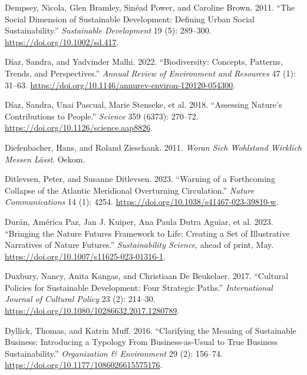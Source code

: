 \documentclass[
  a4paper,
  DIV=11,
  numbers=noendperiod,
  oneside,
  openany]{scrreprt}
\newlength{\cslhangindent}
\newenvironment{CSLReferences}[2] %
 {\begin{list}{}{%
  \setlength{\itemindent}{0pt}
  \setlength{\leftmargin}{0pt}
  \setlength{\parsep}{0pt}
  \ifodd #1
   \setlength{\leftmargin}{\cslhangindent}
   \setlength{\itemindent}{-1\cslhangindent}
  \fi
  \setlength{\itemsep}{#2\baselineskip}}}
 {\end{list}}
\begin{document}
\begin{CSLReferences}{1}{1}
Dempsey, Nicola, Glen Bramley, Sinéad Power, and Caroline Brown. 2011.
{``The Social Dimension of Sustainable Development: {Defining} Urban
Social Sustainability.''} \emph{Sustainable Development} 19 (5):
289--300. \url{https://doi.org/10.1002/sd.417}.

Díaz, Sandra, and Yadvinder Malhi. 2022. {``Biodiversity: {Concepts},
{Patterns}, {Trends}, and {Perspectives}.''} \emph{Annual Review of
Environment and Resources} 47 (1): 31--63.
\url{https://doi.org/10.1146/annurev-environ-120120-054300}.

{Díaz, Sandra, Unai Pascual, Marie Stenseke, et al.} 2018. {``Assessing
Nature's Contributions to People.''} \emph{Science} 359 (6373): 270--72.
\url{https://doi.org/10.1126/science.aap8826}.

Diefenbacher, Hans, and Roland Zieschank. 2011. \emph{Woran Sich
{Wohlstand} Wirklich Messen Lässt}. Oekom.

Ditlevsen, Peter, and Susanne Ditlevsen. 2023. {``Warning of a
Forthcoming Collapse of the {Atlantic} Meridional Overturning
Circulation.''} \emph{Nature Communications} 14 (1): 4254.
\url{https://doi.org/10.1038/s41467-023-39810-w}.

Durán, América Paz, Jan J. Kuiper, Ana Paula Dutra Aguiar, et al. 2023.
{``Bringing the {Nature Futures Framework} to Life: Creating a Set of
Illustrative Narratives of Nature Futures.''} \emph{Sustainability
Science}, ahead of print, May.
\url{https://doi.org/10.1007/s11625-023-01316-1}.

Duxbury, Nancy, Anita Kangas, and Christiaan De Beukelaer. 2017.
{``Cultural Policies for Sustainable Development: Four Strategic
Paths.''} \emph{International Journal of Cultural Policy} 23 (2):
214--30. \url{https://doi.org/10.1080/10286632.2017.1280789}.

Dyllick, Thomas, and Katrin Muff. 2016. {``Clarifying the {Meaning} of
{Sustainable Business}: {Introducing} a {Typology From
Business-as-Usual} to {True Business Sustainability}.''}
\emph{Organization \& Environment} 29 (2): 156--74.
\url{https://doi.org/10.1177/1086026615575176}.


\end{CSLReferences}
\end{document}
